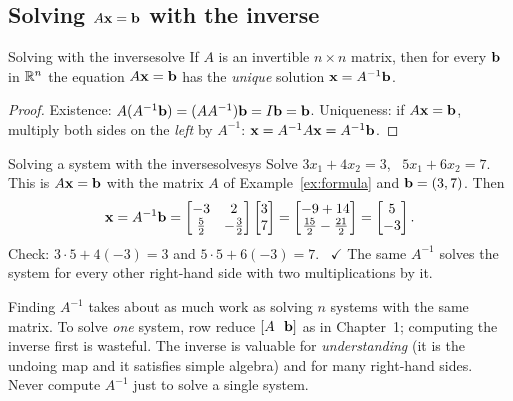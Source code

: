 \documentclass[11pt]{article}
\begin{document}
\subsection*{Solving $A\mathbf{x}=\mathbf{b}$ with the inverse}

\begin{thm}{Solving with the inverse}{solve}
If $A$ is an invertible $n\times n$ matrix, then for every $\mathbf{b}$ in $\mathbb{R}^n$ the equation $A\mathbf{x}=\mathbf{b}$ has the \emph{unique} solution $\mathbf{x}=A^{-1}\mathbf{b}$.
\end{thm}

\begin{proof}
Existence: $A(A^{-1}\mathbf{b})=(AA^{-1})\mathbf{b}=I\mathbf{b}=\mathbf{b}$. Uniqueness: if $A\mathbf{x}=\mathbf{b}$, multiply both sides on the \emph{left} by $A^{-1}$: $\mathbf{x}=A^{-1}A\mathbf{x}=A^{-1}\mathbf{b}$.
\end{proof}

\begin{exmp}{Solving a system with the inverse}{solvesys}
Solve $3x_1+4x_2=3$, \ $5x_1+6x_2=7$. This is $A\mathbf{x}=\mathbf{b}$ with the matrix $A$ of Example~\ref{ex:formula} and $\mathbf{b}=(3,7)$. Then
\[
\mathbf{x}=A^{-1}\mathbf{b}=\begin{bmatrix}-3&2\\\tfrac52&-\tfrac32\end{bmatrix}\begin{bmatrix}3\\7\end{bmatrix}=\begin{bmatrix}-9+14\\\tfrac{15}2-\tfrac{21}2\end{bmatrix}=\begin{bmatrix}5\\-3\end{bmatrix}.
\]
Check: $3\cdot5+4(-3)=3$ and $5\cdot5+6(-3)=7$. \ $\checkmark$ The same $A^{-1}$ solves the system for every other right-hand side with two multiplications by it.
\end{exmp}

\begin{warn}
Finding $A^{-1}$ takes about as much work as solving $n$ systems with the same matrix. To solve \emph{one} system, row reduce $[A\ \ \mathbf{b}]$ as in Chapter~1; computing the inverse first is wasteful. The inverse is valuable for \emph{understanding} (it is the undoing map and it satisfies simple algebra) and for many right-hand sides. Never compute $A^{-1}$ just to solve a single system.
\end{warn}
\end{document}
